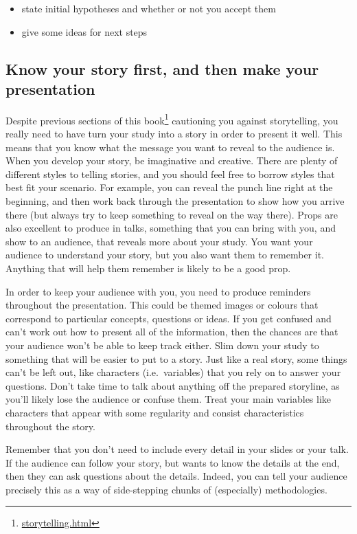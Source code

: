 \documentclass[
]{krantz}
\providecommand{\tightlist}{%
  \setlength{\itemsep}{0pt}\setlength{\parskip}{0pt}}
\renewcommand{\href}[2]{#2\footnote{\url{#1}}}
\begin{document}
\begin{itemize}
\tightlist
\item
  state initial hypotheses and whether or not you accept them
\item
  give some ideas for next steps
\end{itemize}

\hypertarget{know-your-story-first-and-then-make-your-presentation}{%
\subsection{Know your story first, and then make your presentation}\label{know-your-story-first-and-then-make-your-presentation}}

Despite previous sections \href{storytelling.html}{of this book} cautioning you against storytelling, you really need to have turn your study into a story in order to present it well. This means that you know what the message you want to reveal to the audience is. When you develop your story, be imaginative and creative. There are plenty of different styles to telling stories, and you should feel free to borrow styles that best fit your scenario. For example, you can reveal the punch line right at the beginning, and then work back through the presentation to show how you arrive there (but always try to keep something to reveal on the way there). Props are also excellent to produce in talks, something that you can bring with you, and show to an audience, that reveals more about your study. You want your audience to understand your story, but you also want them to remember it. Anything that will help them remember is likely to be a good prop.

In order to keep your audience with you, you need to produce reminders throughout the presentation. This could be themed images or colours that correspond to particular concepts, questions or ideas. If you get confused and can't work out how to present all of the information, then the chances are that your audience won't be able to keep track either. Slim down your study to something that will be easier to put to a story. Just like a real story, some things can't be left out, like characters (i.e.~variables) that you rely on to answer your questions. Don't take time to talk about anything off the prepared storyline, as you'll likely lose the audience or confuse them. Treat your main variables like characters that appear with some regularity and consist characteristics throughout the story.

Remember that you don't need to include every detail in your slides or your talk. If the audience can follow your story, but wants to know the details at the end, then they can ask questions about the details. Indeed, you can tell your audience precisely this as a way of side-stepping chunks of (especially) methodologies.
\end{document}
